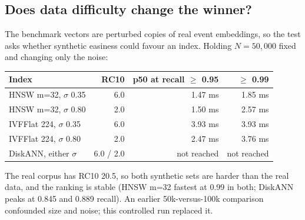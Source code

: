 \documentclass[11pt,a4paper]{article}
\begin{document}
\subsection{Does data difficulty change the winner?}
The benchmark vectors are perturbed copies of real event embeddings, so the test asks whether synthetic easiness could favour an index. Holding $N=50{,}000$ fixed and changing only the noise:
\begin{table}[H]
\centering
\small
\begin{tabular}{lrrr}
\toprule
Index & RC10 & p50 at recall $\ge$ 0.95 & $\ge$ 0.99\\
\midrule
HNSW m=32, $\sigma$ 0.35 & 6.0 & 1.47 ms & 1.85 ms\\
HNSW m=32, $\sigma$ 0.80 & 2.0 & 1.50 ms & 2.57 ms\\
IVFFlat 224, $\sigma$ 0.35 & 6.0 & 3.93 ms & 3.93 ms\\
IVFFlat 224, $\sigma$ 0.80 & 2.0 & 2.47 ms & 3.76 ms\\
DiskANN, either $\sigma$ & 6.0 / 2.0 & not reached & not reached\\
\bottomrule
\end{tabular}
\end{table}
The real corpus has RC10 20.5, so both synthetic sets are harder than the real data, and the ranking is stable (HNSW m=32 fastest at 0.99 in both; DiskANN peaks at 0.845 and 0.889 recall). An earlier 50k-versus-100k comparison confounded size and noise; this controlled run replaced it.
\end{document}
